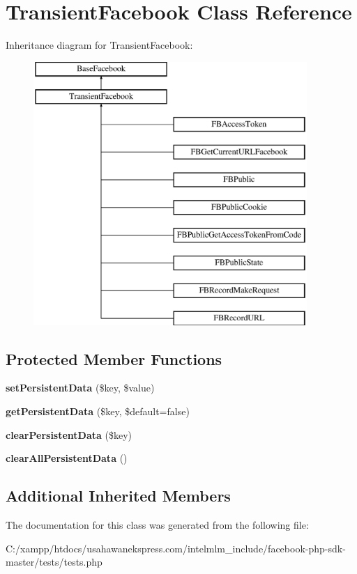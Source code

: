 \hypertarget{class_transient_facebook}{\section{Transient\-Facebook Class Reference}
\label{class_transient_facebook}
}
Inheritance diagram for Transient\-Facebook\-:\begin{figure}[H]
\begin{center}
\leavevmode
\includegraphics[height=10.000000cm]{class_transient_facebook}
\end{center}
\end{figure}
\subsection*{Protected Member Functions}
\begin{DoxyCompactItemize}
\item 
\hypertarget{class_transient_facebook_a7c395efe8594a2afd06b462e8858fee8}{{\bfseries set\-Persistent\-Data} (\$key, \$value)}\label{class_transient_facebook_a7c395efe8594a2afd06b462e8858fee8}

\item 
\hypertarget{class_transient_facebook_a2d31791ed8c3a7d09a4338aec8749a7d}{{\bfseries get\-Persistent\-Data} (\$key, \$default=false)}\label{class_transient_facebook_a2d31791ed8c3a7d09a4338aec8749a7d}

\item 
\hypertarget{class_transient_facebook_afff378a3ec897db92a642279b5b4b738}{{\bfseries clear\-Persistent\-Data} (\$key)}\label{class_transient_facebook_afff378a3ec897db92a642279b5b4b738}

\item 
\hypertarget{class_transient_facebook_ad0f8fc371cee2e8a6aaf5972bd5e7d6a}{{\bfseries clear\-All\-Persistent\-Data} ()}\label{class_transient_facebook_ad0f8fc371cee2e8a6aaf5972bd5e7d6a}

\end{DoxyCompactItemize}
\subsection*{Additional Inherited Members}


The documentation for this class was generated from the following file\-:\begin{DoxyCompactItemize}
\item 
C\-:/xampp/htdocs/usahawanekspress.\-com/intelmlm\-\_\-include/facebook-\/php-\/sdk-\/master/tests/tests.\-php\end{DoxyCompactItemize}

